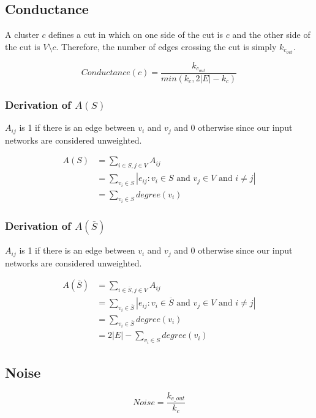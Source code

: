 \documentclass[aps,pre,superscriptaddress]{revtex4}
\begin{document}
\subsection{Conductance}
A cluster $c$ defines a cut in which on one side of the cut is $c$ and the other side of the cut is $V \setminus c$. Therefore, the number of edges crossing the cut is simply $k_{c_{out}}$.


\begin{equation}
Conductance(c) = \frac{k_{c_{out}}}{min(k_{c}, 2|E|-k_{c})}
\end{equation}

\subsubsection{Derivation of $A(S)$}
$A_{ij}$ is 1 if there is an edge between $v_{i}$ and $v_{j}$ and 0 otherwise since our input networks are considered unweighted.

\begin{align}
A(S) &= \sum_{i \in S,j\in V}{A_{ij}} \\
&= \sum_{v_{i} \in S}{|{e_{ij} : v_{i} \in S \text{ and } v_{j} \in V \text { and } i \neq j}|} \\
&= \sum_{v_{i} \in S}{degree(v_{i})}
\end{align}

\subsubsection{Derivation of $A(\overline{S})$}
$A_{ij}$ is 1 if there is an edge between $v_{i}$ and $v_{j}$ and 0 otherwise since our input networks are considered unweighted.

\begin{align}
A(\overline{S}) &= \sum_{i \in \overline{S},j\in V}{A_{ij}} \\
&= \sum_{v_{i} \in \overline{S}}{|{e_{ij} : v_{i} \in \overline{S} \text{ and } v_{j} \in V \text { and } i \neq j}|} \\
&= \sum_{v_{i} \in \overline{S}}{degree(v_{i})} \\
&= 2|E| - \sum_{v_{i} \in S}{degree(v_{i})} 
\end{align}


\subsection{Noise}

\begin{equation}
Noise = \frac{k_{c\_out}}{k_{c}}
\end{equation}
\end{document}
